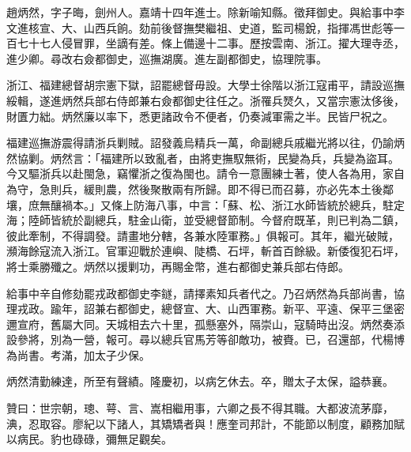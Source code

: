 \begin{pinyinscope}
趙炳然，字子晦，劍州人。嘉靖十四年進士。除新喻知縣。徵拜御史。與給事中李文進核宣、大、山西兵餉。劾前後督撫樊繼祖、史道，監司楊銳，指揮馮世彪等一百七十七人侵冒罪，坐謫有差。條上備邊十二事。歷按雲南、浙江。擢大理寺丞，進少卿。尋改右僉都御史，巡撫湖廣。進左副都御史，協理院事。

浙江、福建總督胡宗憲下獄，詔罷總督毋設。大學士徐階以浙江寇甫平，請設巡撫綏輯，遂進炳然兵部右侍郎兼右僉都御史往任之。浙罹兵燹久，又當宗憲汰侈後，財匱力絀。炳然廉以率下，悉更諸政令不便者，仍奏減軍需之半。民皆尸祝之。

福建巡撫游震得請浙兵剿賊。詔發義烏精兵一萬，命副總兵戚繼光將以往，仍諭炳然協剿。炳然言：「福建所以致亂者，由將吏撫馭無術，民變為兵，兵變為盜耳。今又驅浙兵以赴閩急，竊懼浙之復為閩也。請令一意團練士著，使人各為用，家自為守，急則兵，緩則農，然後聚散兩有所歸。即不得已而召募，亦必先本土後鄰壤，庶無釀禍本。」又條上防海八事，中言：「蘇、松、浙江水師皆統於總兵，駐定海；陸師皆統於副總兵，駐金山衛，並受總督節制。今督府既革，則已判為二鎮，彼此牽制，不得調發。請畫地分轄，各兼水陸軍務。」俱報可。其年，繼光破賊，瀕海餘寇流入浙江。官軍迎戰於連嶼、陡橋、石坪，斬首百餘級。新倭復犯石坪，將士乘勝殲之。炳然以援剿功，再賜金幣，進右都御史兼兵部右侍郎。

給事中辛自修劾罷戎政都御史李鐩，請擇素知兵者代之。乃召炳然為兵部尚書，協理戎政。踰年，詔兼右都御史，總督宣、大、山西軍務。新平、平遠、保平三堡密邇宣府，舊屬大同。天城相去六十里，孤懸塞外，隔崇山，寇騎時出沒。炳然奏添設參將，別為一營，報可。尋以總兵官馬芳等卻敵功，被賚。已，召還部，代楊博為尚書。考滿，加太子少保。

炳然清勤練達，所至有聲績。隆慶初，以病乞休去。卒，贈太子太保，謚恭襄。

贊曰：世宗朝，璁、萼、言、嵩相繼用事，六卿之長不得其職。大都波流茅靡，淟，忍取容。廖紀以下諸人，其矯矯者與！應奎司邦計，不能節以制度，顧務加賦以病民。豹也碌碌，彌無足觀矣。


\end{pinyinscope}